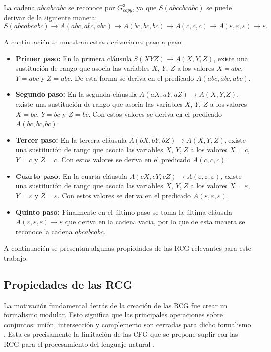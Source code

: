 \documentclass{article}
\begin{document}
La cadena $abcabcabc$ se reconoce por $G^3_{copy}$, ya que $S(abcabcabc)$ se puede derivar de la siguiente manera:
$$S(abcabcabc)\to A(abc,abc,abc)\to A(bc,bc,bc)\to A(c,c,c)\to A(\varepsilon,\varepsilon,\varepsilon)\to \varepsilon.$$

A continuación se muestran estas derivaciones paso a paso.

\begin{itemize}
    \item \textbf{Primer paso:} En la primera cláusula $S(XYZ)\to A(X,Y,Z)$, existe una sustitución de rango que asocia las variables $X$, $Y$, $Z$ a los valores $X=abc$, $Y=abc$ y $Z=abc$. De esta forma se deriva en el predicado $A(abc,abc,abc)$.
    \item \textbf{Segundo paso:} En la segunda cláusula $A(aX,aY,aZ)\to A(X,Y,Z)$, existe una sustitución de rango que asocia las
          variables $X$, $Y$, $Z$ a los valores $X=bc$, $Y=bc$ y $Z=bc$. Con estos valores se deriva en el predicado $A(bc,bc,bc)$.
    \item \textbf{Tercer paso:} En la tercera cláusula $A(bX,bY,bZ)\to A(X,Y,Z)$, existe una sustitución de rango que asocia las
          variables $X$, $Y$, $Z$ a los valores $X=c$, $Y=c$ y $Z=c$. Con estos valores se deriva en el predicado $A(c,c,c)$.
    \item \textbf{Cuarto paso:} En la cuarta cláusula $A(cX,cY,cZ)\to A(\varepsilon,\varepsilon,\varepsilon)$, existe una sustitución de rango que asocia las variables $X$, $Y$, $Z$ a los valores $X=\varepsilon$, $Y=\varepsilon$ y $Z=\varepsilon$. Con estos valores se deriva en el predicado $A(\varepsilon,\varepsilon,\varepsilon)$.
    \item \textbf{Quinto paso:} Finalmente en el último paso se toma la última cláusula $A(\varepsilon,\varepsilon,\varepsilon)\to \varepsilon$ que deriva en la cadena vacía, por lo que de esta manera se reconoce la cadena $abcabcabc$.
\end{itemize}


A continuación se presentan algunas propiedades de las RCG relevantes para este trabajo.

\subsection{Propiedades de las RCG}

La motivación fundamental detrás de la creación de las RCG fue crear un formalismo modular. Esto significa que las principales operaciones sobre conjuntos: unión, intersección y complemento son cerradas para dicho formalismo \cite{mainRCGBib}.  Esta es precisamente la limitación de las CFG que se propone suplir con las RCG para el procesamiento del lenguaje natural \cite{mainRCGBib}.
\end{document}
